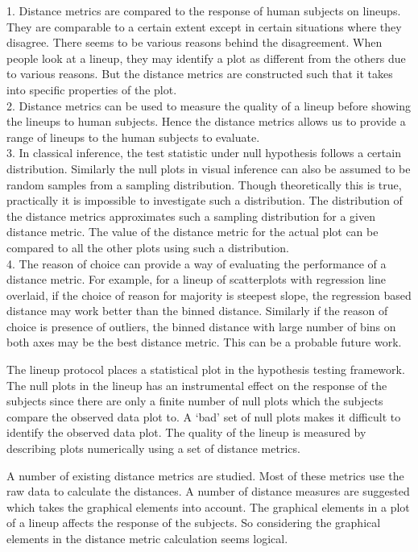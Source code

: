 \documentclass[12]{article}
\begin{document}
{\color{red} 1.  Distance metrics are compared to the response of human subjects on lineups. They are comparable to a certain extent except in certain situations where they disagree. There seems to be various reasons behind the disagreement. When people look at a lineup, they may identify a plot as different from the others due to various reasons. But the distance metrics are constructed such that it takes into specific properties of the plot. \\

2. Distance metrics can be used to measure the quality of a lineup before showing the lineups to human subjects. Hence the distance metrics allows us to provide a range of lineups to the human subjects to evaluate. \\

3.  In classical inference, the test statistic under null hypothesis follows a certain distribution. Similarly the null plots in visual inference can also be assumed to be random samples from a sampling distribution. Though theoretically this is true, practically it is impossible to investigate such a distribution. The distribution of the distance metrics approximates such a sampling distribution for a given distance metric. The value of the distance metric for the actual plot can be compared to all the other plots using such a distribution.\\

4. The reason of choice can provide a way of evaluating the performance of a distance metric. For example, for a lineup of scatterplots with regression line overlaid, if the choice of reason for majority is steepest slope, the regression based distance may work better than the binned distance. Similarly if the reason of choice is presence of outliers, the binned distance with large number of bins on both axes may be the best distance metric. This can be a probable future work.\\
 }

The lineup protocol places a statistical plot in the hypothesis testing framework. The null plots in the lineup has an instrumental effect on the response of the subjects since there are only a finite number of null plots which the subjects compare the observed data plot to. A `bad' set of null plots makes it difficult to identify the observed data plot. The quality of the lineup is measured by describing plots numerically using a set of distance metrics. 

A number of existing distance metrics are studied. Most of these metrics use the raw data to calculate the distances. A number of distance measures are suggested which takes the graphical elements into account. The graphical elements in a plot of a lineup affects the response of the subjects. So considering the graphical elements in the distance metric calculation seems logical.
\end{document}
